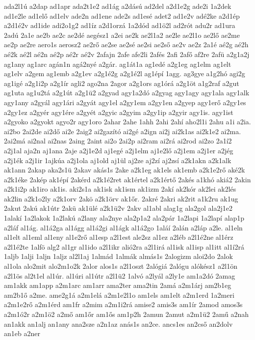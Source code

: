 {ada2l1ú
a2dap
ad1apr
ada2t1e2
ad1ág
a2dású
ad2del
a2d1e2g
ade2i
1a2dek
ad1e2le
ad1elő
ad1elv
ade2n
ad1ene
ade2s
ad1esé
adet2
ad1e2v
adé2ke
a2d1ép
a2d1é2v
ad1ide
adi2o1g2
ad1íz
a2d1orzá
1a2dód
ad1ö2l
ad2rót
adu2r
ad1ura
2adú
2a1e
ae2b
ae2c
ae2dé
aegész1
a2ei
ae2k
ae2l1a2
ae2le
ae2l1o
ae2lő
ae2me
ae2p
ae2re
aero1s
aerosz2
ae2rő
ae2se
ae2sé
ae2si
ae2ső
ae2v
ae2z
2a1é
aé2g
aé2h
aé2k
aé2l
aé2n
aé2p
aé2r
aé2v
2afajn
2afe
afe2li
2afés
2afi
2afő
af2re
2afü
a2g1a2j
ag1any
ag1arc
agán1n
agá2nyé
a2gár.
ag1át1a
ag1edé
a2g1eg
ag1elm
ag1elt
ag1elv
a2gem
ag1emb
a2g1ev
a2g1é2g
a2g1é2l
ag1épí
1agg.
ag3gye
a1g2hó
agi2g
ag1igé
a2g1i2p
a2g1ír
agli2
ago2na
2agor
a2g1ors
ag1órá
a2g1öt
a1g2raf
a2gut
ag1uta
ag1u2tá
a2g1út
a2g1ü2
a2gyad
agy1a2dó
a2gyag
agy1agy
agy1ala
agy1alk
agy1any
a2gyál
agy1ári
a2gyát
agy1el
a2gy1em
a2gy1en
a2gyep
agy1erő
a2gy1es
a2gy1ez
a2gyér
agy1ére
a2gyét
a2gyic
a2gyim
a2gy1ip
a2gyir
agy1is.
agy1ist
a2gyoko
a2gyokt
agyo2r
agy1oro
2ahar
2ahe
1ahh
2ahi
2ahí
aho2l1i
2ahu
a1i
a2ia.
ai2bo
2ai2de
ai2dő
ai2e
2aig2
ai2gazító
ai2gé
a2ign
ai2j
ai2k1as
ai2k1e2
ai2ma.
2ai2má
ai2nal
ai2nas
2aing
2aint
ai2o
2ai2p
ai2ram
ai2rá
ai2rod
ai2zo
2a1í2
a2j1al
aja2n
aj1ana
2aje
a2j1e2d
aj1egé
a2j1elm
aj1e2lő
a2j1em
a2j1er
a2jég
a2j1ék
a2j1ir
1ajkúa
a2j1ola
aj1old
aj1ül
aj2ze
aj2zí
aj2zsí
a2k1akn
a2k1alk
ak1ann
2akap
aka2s1ü
2akav
akás1s
2ake
a2k1eg
ak1els
ak1emb
a2k1e2rő
aké2k
a2k1éke
2akép
ak1épí
2akérd
a2k1é2ret
ak1értel
a2k1értő
2akés
a1khó
akiá2
2akin
a2k1i2p
ak1iro
ak1is.
aki2s1a
ak1isk
ak1ism
ak1izm
2akí
ak2kór
ak2lei
ak2lés
ak2lin
a2k1o2ly
a2k1orv
2akö
a2k1örv
ak1őr.
2akré
2akri
ak2rit
a1k2ru
ak1ug
2akut
2akú
ak1útr
2akü
ak1ülé
a2k1ü2v
2akv
al1abl
alag1g
ala2gol
ala2j1e2
1alakí
1a2lakok
1a2lakú
a2lany
ala2nye
ala2p1a2
ala2pár
1a2lapi
1a2lapí
alap1p
a2láf
al1ág.
al1á2ga
al1ágg
al1á2gi
al1ágk
al1á2go
1aláí
2alán
a2láp
a2le.
al1eln
al1elt
al1eml
al1eny
al1e2rő
al1esp
a2l1est
ale2sz
al1ez
a2léb
a2l1é2ne
al1érz
a2l1é2te
1alfö
alg2
al1gr
al1ido
a2l1ikr
alió2ra
a2l1irá
al1isk
al1isp
al1itt
al1í2rá
1aljb
1alji
1aljn
1aljz
al2l1aj
1almád
1almák
almás1s
2alogizm
aloi2do
2alok
al1ola
alo2mit
alo2m1o2k
2alor
alos1s
a2l1oszt
2alógiá
2alógu
alókész1
a2l1ön
a2l1ös
al2t1el
al1úr.
al1úri
al1útr
a2l1ü2
1alvó
a2lyál
a2ly1e
am1a2dó
2amag
am1akk
am1app
a2m1arc
am1arr
ama2ter
ama2tin
2amá
a2m1árj
am2b1eg
am2b1ő
a2me.
ame2g1á
a2m1elá
a2m1e2l1o
am1els
am1elt
a2m1erd
1a2meri
a2m1e2rő
a2m1érd
am1fr
a2mim
a2m1i2rá
amise2
amis3s
am1ír
2amod
amos3s
a2m1ó2r
a2m1ö2
a2mő
am1őr
am1ős
am1p2h
2amun
2amut
a2m1ü2
2amű
a2nah
an1akk
an1alj
an1any
ana2sze
a2n1az
anás1s
an2ce.
ancs1es
an2cső
an2dolv
an1eb
a2ner
}

